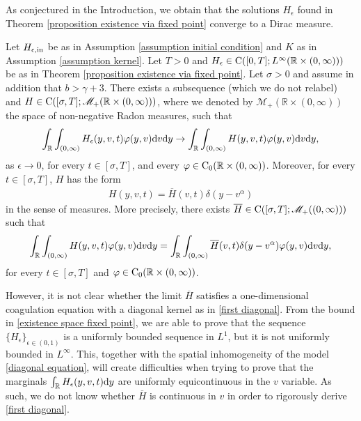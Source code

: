 \documentclass[11pt]{article}
\numberwithin{equation}{section}
\newcommand{\der}{\textup{d}}
\begin{document}
As conjectured in the Introduction, we obtain that the solutions $H_{\epsilon}$ found in Theorem \ref{proposition existence via fixed point} converge to a Dirac measure.
\begin{teo}\label{teo convergence}
  Let $H_{\epsilon,\textup{in}}$ be as in Assumption \ref{assumption initial condition} and $K$ as in Assumption \ref{assumption kernel}. Let $T>0$ and $H_{\epsilon}\in\textup{C}([0,T];L^{\infty}(\mathbb{R}\times(0,\infty)))$ be as in Theorem \ref{proposition existence via fixed point}. Let $\sigma>0$ and assume in addition that $b>\gamma+3$. There exists a subsequence (which we do not relabel) and $H\in\textup{C}([\sigma,T];  \mathscr{M}_{+}(\mathbb{R}\times(0,\infty)))$, where we denoted by $  \mathscr{M}_{+}(\mathbb{R}\times(0,\infty))$ the space of non-negative Radon measures, such that
\begin{align*}
\int_{\mathbb{R}}\int_{(0,\infty)}H_{\epsilon}(y,v,t)\varphi(y,v)\der v\der y\rightarrow \int_{\mathbb{R}}\int_{(0,\infty)}H(y,v,t)\varphi(y,v)\der v\der y,
\end{align*}
as $\epsilon\rightarrow 0$, for every $t\in[\sigma,T]$, and every $\varphi\in\textup{C}_{0}(\mathbb{R}\times(0,\infty))$. Moreover, for every $t\in[\sigma,T]$, $H$ has the form 
\begin{align}\label{form of limit}
H(y,v,t)=\overline{H}(v,t)\delta(y-v^{\alpha})
\end{align}
in the sense of measures. More precisely, there exists $\overline{H}\in\textup{C}([\sigma,T];\mathscr{M}_{+}((0,\infty)))$ such that
\begin{align*}
\int_{\mathbb{R}}\int_{(0,\infty)}H(y,v,t)\varphi(y,v)\der v \der y=\int_{\mathbb{R}}\int_{(0,\infty)}\overline{H}(v,t)\delta(y-v^{\alpha})\varphi(y,v)\der v\der y,
\end{align*}
for every $t\in[\sigma,T]$ and $\varphi\in\textup{C}_{0}(\mathbb{R}\times(0,\infty))$.
\end{teo}
However, it is not clear whether the limit $\overline{H}$ satisfies a one-dimensional coagulation equation with a diagonal kernel as in \eqref{first diagonal}. From the bound in \eqref{existence space fixed point}, we are able to prove that the sequence $\{H_{\epsilon}\}_{\epsilon\in(0,1)}$ is a uniformly bounded sequence in $L^{1}$, but it is not uniformly bounded in $L^{\infty}$. This, together with the spatial inhomogeneity of the model \eqref{diagonal equation}, will create difficulties when trying to prove that the marginals $\int_{\mathbb{R}} H_{\epsilon}(y,v,t)\der y$ are uniformly equicontinuous in the $v$ variable. As such, we do not know whether $\overline{H}$ is continuous in $v$ in order to rigorously derive \eqref{first diagonal}.
\end{document}

